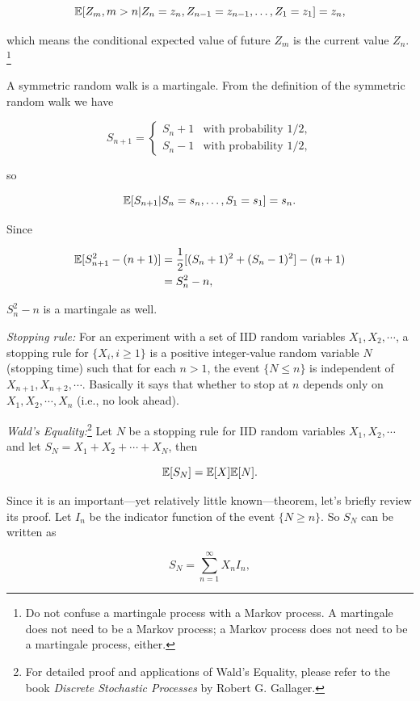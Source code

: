 \[
\mathbb{E}[Z_m,m>n\vert Z_n=z_n,Z_{n-1}=z_{n-1},\ldots,Z_1=z_1]=z_n,
\]

which means the conditional expected value of future $Z_m$ is the current value $Z_n$.
\footnote[6]{Do not confuse a martingale process with a Markov process. A martingale does not
need to be a Markov process; a Markov process does not need to be a martingale process,
either.}

A symmetric random walk is a martingale. From the definition of the symmetric random
walk we have

\[
S_{n+1}=\begin{cases}
S_n+1 & \text{with probability }1/2,\\
S_n-1 & \text{with probability }1/2,
\end{cases}
\]

so

\[
\mathbb{E}[S_{n+1}\vert S_n=s_n,\ldots,S_1=s_1]=s_n.
\]

Since

\[
\begin{aligned}
\mathbb{E}[S_{n+1}^2-(n+1)]
&=\frac{1}{2}[(S_n+1)^2+(S_n-1)^2]-(n+1)\\
&=S_n^2-n,
\end{aligned}
\]

$S_n^2-n$ is a martingale as well.


\noindent\emph{Stopping rule:} For an experiment with a set of IID random variables
$X_1,X_2,\cdots$, a stopping rule for $\{X_i,i\geq1\}$ is a positive integer-value random
variable $N$ (stopping time) such that for each $n>1$, the event $\{N\leq n\}$ is
independent of $X_{n+1},X_{n+2},\cdots$. Basically it says that whether to stop at $n$
depends only on $X_1,X_2,\cdots,X_n$ (i.e., no look ahead).

\noindent\emph{Wald's Equality:}\footnote[7]{For detailed proof and applications of Wald's
Equality, please refer to the book \textit{Discrete Stochastic Processes} by Robert G.
Gallager.} Let $N$ be a stopping rule for IID random variables
$X_1,X_2,\cdots$ and let $S_N=X_1+X_2+\cdots+X_N$, then

\[
\mathbb{E}[S_N]=\mathbb{E}[X]\mathbb{E}[N].
\]

Since it is an important---yet relatively little known---theorem, let's briefly review its
proof. Let $I_n$ be the indicator function of the event $\{N\geq n\}$. So $S_N$ can be
written as

\[
S_N=\sum_{n=1}^{\infty}X_nI_n,
\]

